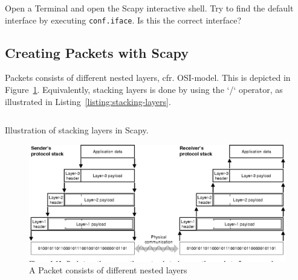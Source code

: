 \documentclass[11pt,a4paper]{article}
\begin{document}
\begin{question}
    Open a Terminal and open the Scapy interactive shell. Try to find the default interface by executing \texttt{conf.iface}. Is this the correct interface? 
\end{question}

\subsection{Creating Packets with Scapy}
Packets consists of different nested layers, cfr. OSI-model. This is depicted in Figure~\ref{fig:nested_layers_packet}. Equivalently, stacking layers is done by using the `/` operator, as illustrated in Listing~\ref{listing:stacking-layers}.

\begin{listing}[h]
\inputminted{python}{../code_students/example_stacking_layers.py}
\caption{Illustration of stacking layers in Scapy.}%
\label{listing:stacking-layers}
\end{listing}



\begin{figure}
    \centering
    \includegraphics[width=\textwidth]{packet_layered.png}
    \caption{A Packet consists of different nested layers}%
    \label{fig:nested_layers_packet}
\end{figure}

\end{document}
